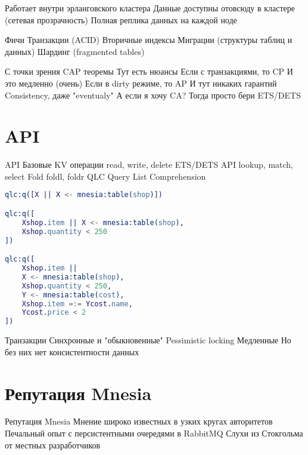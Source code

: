 \documentclass[9pt]{beamer}
\begin{document}
\begin{frame}
 Работает внутри эрланговского кластера
Данные доступны отовсюду в кластере (сетевая прозрачность)
Полная реплика данных на каждой ноде
\end{frame}

\begin{frame}
 Фичи
Транзакции (ACID)
Вторичные индексы
Миграции (структуры таблиц и данных)
Шардинг (fragmented tables)
\end{frame}

\begin{frame}
 С точки зрения CAP теоремы
Тут есть нюансы
 Если с транзакциями, то CP
И это медленно (очень)
 Если в dirty режиме, то AP
И тут никаких гарантий Consistency, даже "eventualy"
 А если я хочу CA?
Тогда просто бери ETS/DETS
\end{frame}

\section{API}

\begin{frame}
 API
 Базовые KV операции
read, write, delete
 ETS/DETS API
lookup, match, select
 Fold
foldl, foldr
 QLC
Query List Comprehension
\end{frame}

\begin{frame}[fragile]
\begin{lstlisting}[language=Erlang]
qlc:q([X || X <- mnesia:table(shop)])

qlc:q([
    Xshop.item || X <- mnesia:table(shop),
    Xshop.quantity < 250
])

qlc:q([
    Xshop.item ||
    X <- mnesia:table(shop),
    Xshop.quantity < 250,
    Y <- mnesia:table(cost),
    Xshop.item =:= Ycost.name,
    Ycost.price < 2
])
\end{lstlisting}
\end{frame}

\begin{frame}
 Транзакции
Синхронные и "обыкновенные"
Pessimistic locking
Медленные
Но без них нет консистентности данных
\end{frame}

\section{Репутация Mnesia}

\begin{frame}
 Репутация Mnesia
Мнение широко известных в узких кругах авторитетов
Печальный опыт с персистентными очередями в RabbitMQ
Слухи из Стокгольма от местных разработчиков
\end{frame}
\end{document}
